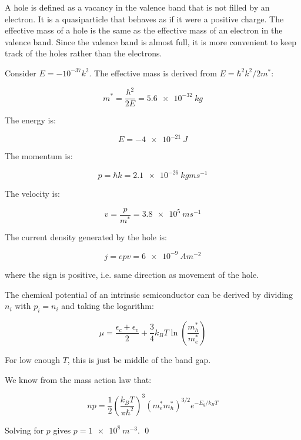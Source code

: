 \documentclass[12pt]{article}
\begin{document}


A hole is defined as a vacancy in the valence band that is not filled by an electron. It is a quasiparticle that behaves as if it were a positive charge. The effective mass of a hole is the same as the effective mass of an electron in the valence band. Since the valence band is almost full, it is more convenient to keep track of the holes rather than the electrons.

Consider $E = -10^{-37} k^{2}$. The effective mass is derived from $E = \hbar^{2}k^{2}/2m^{*}$:

\begin{equation}
    m^{*} = \frac{\hbar^{2}}{2E} = \qty{5.6e-32}{kg}
\end{equation}

The energy is:

\begin{equation}
    E = \qty{-4e-21}{J}
\end{equation}

The momentum is:

\begin{equation}
    p = \hbar k = \qty{2.1e-26}{kg ms^{-1}}
\end{equation}

The velocity is:

\begin{equation}
    v = \frac{p}{m^{*}} = \qty{3.8e5}{ms^{-1}}
\end{equation}

The current density generated by the hole is:

\begin{equation}
    j = epv = \qty{6e-9}{Am^{-2}}
\end{equation}

where the sign is positive, i.e. same direction as movement of the hole.

The chemical potential of an intrinsic semiconductor can be derived by dividing $n_{i}$ with $p_{i} = n_{i}$ and taking the logarithm:

\begin{equation}
    \mu = \frac{\epsilon_{c} + \epsilon_{v}}{2} + \frac{3}{4} k_{B}T \ln{\left( \frac{m_{h}^{*}}{m_{e}^{*}} \right)}
\end{equation}

For low enough $T$, this is just be middle of the band gap.

We know from the mass action law that:

\begin{equation}
    np = \frac{1}{2} \left( \frac{k_{B}T}{\pi \hbar^{2}} \right)^{3} (m_{e}^{*}m_{h}^{*})^{3/2} e^{-E_{g}/k_{B}T}
\end{equation}

Solving for $p$ gives $p = \qty{1e8}{m^{-3}}$.
\qed
\end{document}
